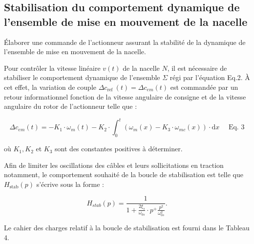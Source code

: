 \subsection{Stabilisation du comportement dynamique de l'ensemble de mise en mouvement de la nacelle}

\begin{obj}
Élaborer une commande de l'actionneur assurant la stabilité de la dynamique de l'ensemble de mise en mouvement de la nacelle.
\end{obj}

Pour contrôler la vitesse linéaire $v(t)$ de la nacelle $N$, il est nécessaire de stabiliser le comportement dynamique de l'ensemble $\Sigma$ régi par l'équation Eq.2. À cet effet, la variation de couple $\Delta c_{\text {ref }}(t)=\Delta c_{e m}(t)$ est commandée par un retour informationnel fonction de la vitesse angulaire de consigne et de la vitesse angulaire du rotor de l'actionneur telle que :

$$
\Delta c_{e m}(t)=-K_{1} \cdot \omega_{m}(t)-K_{2} \cdot \int_{0}^{t}\left(\omega_{m}(x)-K_{3} \cdot \omega_{m c}(x)\right) \cdot \mathrm{d} x \quad \text { Eq. } 3
$$

où $K_{1}, K_{2}$ et $K_{3}$ sont des constantes positives à déterminer.\\



Afin de limiter les oscillations des câbles et leurs sollicitations en traction notamment, le comportement souhaité de la boucle de stabilisation est telle que $H_{\text{stab}}(p)$ s'écrive sous la forme :

$$
H_{sta b}(p)=\frac{1}{1+\frac{2 \xi_{s}}{\omega_{0 s}} \cdot p^{+} \frac{p^{2}}{\omega_{0 s}^{2}}} .
$$

Le cahier des charges relatif à la boucle de stabilisation est fourni dans le Tableau 4.

